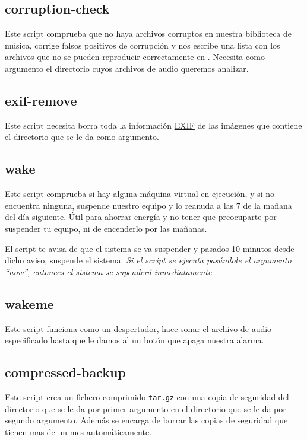 \documentclass[11pt]{article}
\begin{document}
\subsection{corruption-check}

Este script comprueba que no haya archivos corruptos en nuestra biblioteca de música, corrige falsos positivos de corrupción y nos escribe una lista con los archivos que no se pueden reproducir correctamente en . Necesita como argumento el directorio cuyos archivos de audio queremos analizar.

\subsection{exif-remove}

Este script necesita borra toda la información \href{https://en.wikipedia.org/wiki/Exif}{EXIF} de las imágenes que contiene el directorio que se le da como argumento.

\subsection{wake}

Este script comprueba si hay alguna máquina virtual en ejecución, y si no encuentra ninguna, suspende nuestro equipo y lo reanuda a las 7 de la mañana del día siguiente. Útil para ahorrar energía y no tener que preocuparte por suspender tu equipo, ni de encenderlo por las mañanas.

\medskip
El script te avisa de que el sistema se va suspender y pasados 10 minutos desde dicho aviso, suspende el sistema. \emph{Si el script se ejecuta pasándole el argumento ``now'', entonces el sistema se supenderá inmediatamente}.

\subsection{wakeme}

Este script funciona como un despertador, hace sonar el archivo de audio especificado hasta que le damos al un botón que apaga nuestra alarma.

\subsection{compressed-backup}

Este script crea un fichero comprimido \texttt{tar.gz} con una copia de seguridad del directorio que se le da por primer argumento en el directorio que se le da por segundo argumento. Además se encarga de borrar las copias de seguridad que tienen mas de un mes automáticamente.
\end{document}
